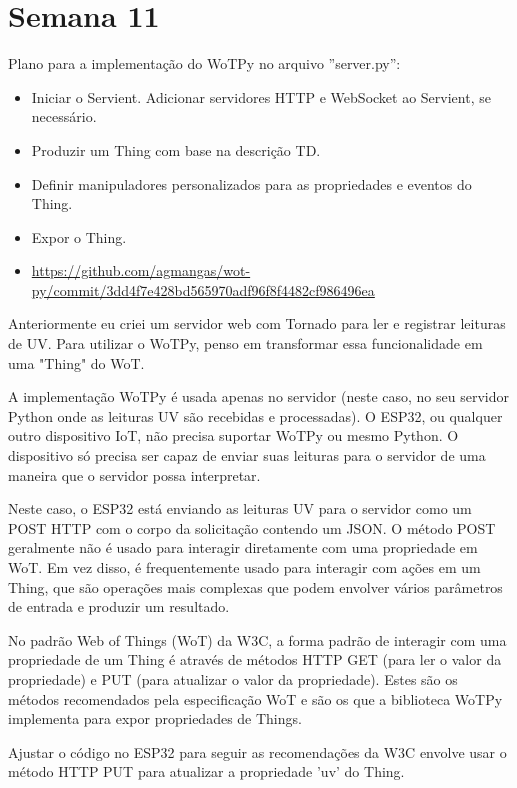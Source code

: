 
\section{Semana 11}

Plano para a implementação do WoTPy no arquivo ''server.py'':

\begin{itemize}
    \item Iniciar o Servient. Adicionar servidores HTTP e WebSocket ao Servient, se necessário.
    \item Produzir um Thing com base na descrição TD.
    \item Definir manipuladores personalizados para as propriedades e eventos do Thing.
    \item Expor o Thing.
    \item \url{https://github.com/agmangas/wot-py/commit/3dd4f7e428bd565970adf96f8f4482cf986496ea}
\end{itemize}

Anteriormente eu criei um servidor web com Tornado para ler e registrar leituras de UV. Para utilizar o WoTPy, penso em transformar essa funcionalidade em uma "Thing" do WoT.

A implementação WoTPy é usada apenas no servidor (neste caso, no seu servidor Python onde as leituras UV são recebidas e processadas). O ESP32, ou qualquer outro dispositivo IoT, não precisa suportar WoTPy ou mesmo Python. O dispositivo só precisa ser capaz de enviar suas leituras para o servidor de uma maneira que o servidor possa interpretar.

Neste caso, o ESP32 está enviando as leituras UV para o servidor como um POST HTTP com o corpo da solicitação contendo um JSON. O método POST geralmente não é usado para interagir diretamente com uma propriedade em WoT. Em vez disso, é frequentemente usado para interagir com ações em um Thing, que são operações mais complexas que podem envolver vários parâmetros de entrada e produzir um resultado.

No padrão Web of Things (WoT) da W3C, a forma padrão de interagir com uma propriedade de um Thing é através de métodos HTTP GET (para ler o valor da propriedade) e PUT (para atualizar o valor da propriedade). Estes são os métodos recomendados pela especificação WoT e são os que a biblioteca WoTPy implementa para expor propriedades de Things.

Ajustar o código no ESP32 para seguir as recomendações da W3C envolve usar o método HTTP PUT para atualizar a propriedade 'uv' do Thing.

